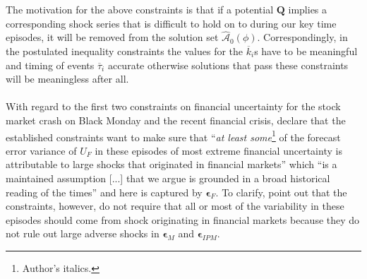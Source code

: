 \documentclass[a4paper,11pt,listof=nochaptergap,oneside,pointednumbers,bibtotoc,bigheadings,liststotoc]{scrbook}
\theoremstyle{mysatz}
\theoremstyle{mydefinition}
\theoremstyle{mybemerkung}
\let\oldhat\hat
\newcommand{\vect}[1]{\boldsymbol{\mathbf{#1}}}
\newcommand{\hatt}[1]{\oldhat{\boldsymbol{\mathbf{#1}}}}
\begin{document}
The motivation for the above constraints is that if a potential $\vect{Q}$ implies a corresponding shock series that is difficult to hold on to during our key time episodes, it will be removed from the solution set $\hatt{\mathcal{A}}_0(\phi)$. Correspondingly, in the postulated inequality constraints the values for the $\overline{k}_i$s have to be meaningful and timing of events $\overline{\tau}_i$ accurate otherwise solutions that pass these constraints will be meaningless after all.
\\
\\
With regard to the first two constraints on financial uncertainty for the stock market crash on Black Monday and the recent financial crisis, \citet{ludvigsonetal:18} declare that the established constraints want to make sure that ``\textit{at least some}\footnote{Author's italics.} of the forecast error variance of $U_F$ in these episodes of most extreme financial uncertainty is attributable to large shocks that originated in financial markets'' which ``is a maintained assumption [...] that we argue is grounded in a broad historical reading of the times'' \citep[p. 8]{ludvigsonetal:18} and here is captured by $\vect{\epsilon}_F$. To clarify, \citet{ludvigsonetal:18} point out that the constraints, however, do not require that all or most of the variability in these episodes should come from shock originating in financial markets because they do not rule out large adverse shocks in $\vect{\epsilon}_M$ and $\vect{\epsilon}_{IPM}$. 
\end{document}
